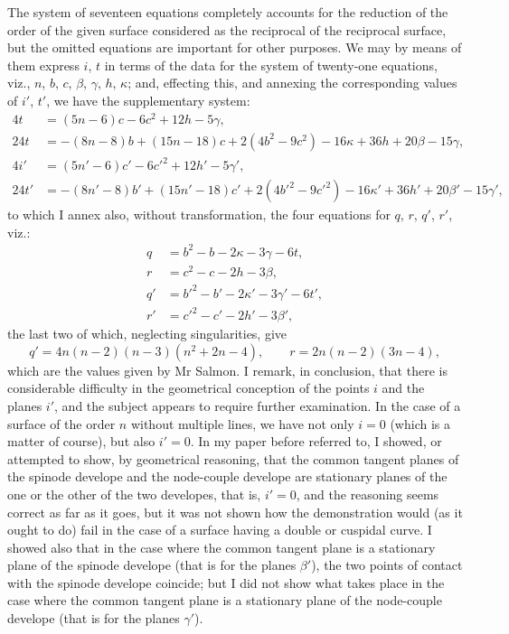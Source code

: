 \documentclass[11pt,a4paper]{book}
\begin{document}
The system of seventeen equations completely accounts for the reduction of the order of the given surface considered as the reciprocal of the reciprocal surface, but the omitted equations are important for other purposes. We may by means of them express $i$, $t$ in terms of the data for the system of twenty-one equations, viz., $n$, $b$, $c$, $\beta$, $\gamma$, $h$, $\kappa$; and, effecting this, and annexing the corresponding values of $i'$, $t'$, we have the supplementary system:
\begin{align*}
4t &= (5n-6)c-6c^2+12h-5\gamma,\\
24t &= -(8n-8)b+(15n-18)c+2(4b^2-9c^2)-16\kappa+36h+20\beta-15\gamma,\\
4i' &= (5n'-6)c'-6c'^2+12h'-5\gamma',\\
24t' &= -(8n'-8)b'+(15n'-18)c'+2(4b'^2-9c'^2)-16\kappa'+36h'+20\beta'-15\gamma',
\end{align*}
to which I annex also, without transformation, the four equations for $q$, $r$, $q'$, $r'$, viz.:
\begin{align*}
q &= b^2-b-2\kappa-3\gamma-6t,\\
r &= c^2-c-2h-3\beta,\\
q' &= b'^2-b'-2\kappa'-3\gamma'-6t',\\
r' &= c'^2-c'-2h'-3\beta',
\end{align*}
the last two of which, neglecting singularities, give
\[
q'=4n(n-2)(n-3)(n^2+2n-4),\qquad r=2n(n-2)(3n-4),
\]
which are the values given by Mr Salmon. I remark, in conclusion, that there is considerable difficulty in the geometrical conception of the points $i$ and the planes $i'$, and the subject appears to require further examination. In the case of a surface of the order $n$ without multiple lines, we have not only $i=0$ (which is a matter of course), but also $i'=0$. In my paper before referred to, I showed, or attempted to show, by geometrical reasoning, that the common tangent planes of the spinode develope and the node-couple develope are stationary planes of the one or the other of the two developes, that is, $i'=0$, and the reasoning seems correct as far as it goes, but it was not shown how the demonstration would (as it ought to do) fail in the case of a surface having a double or cuspidal curve. I showed also that in the case where the common tangent plane is a stationary plane of the spinode develope (that is for the planes $\beta'$), the two points of contact with the spinode develope coincide; but I did not show what takes place in the case where the common tangent plane is a stationary plane of the node-couple develope (that is for the planes $\gamma'$).
\newpage
\end{document}
